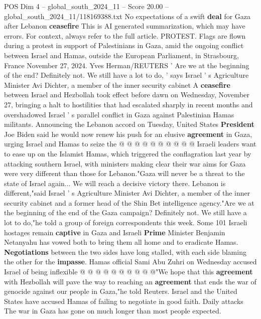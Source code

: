 \begin{textsample}{POS Dim 4 – global\_south\_2024\_11 – Score 20.00 – global\_south\_2024\_11/118169388.txt}  \label{ex:f4_pos_281}
No expectations of a swift \textbf{deal} for Gaza after Lebanon \textbf{ceasefire} This is AI generated summarization, which may have errors.
For context, always refer to the full article.
PROTEST.
Flags are flown during a protest in support of Palestinians in Gaza, amid the ongoing conflict between Israel and Hamas, outside the European Parliament, in Strasbourg, France November 27, 2024.
Yves Herman/REUTERS ' Are we at the beginning of the end?
Definitely not.
We still have a lot to do, ' says Israel ' s Agriculture Minister Avi Dichter, a member of the inner security cabinet A \textbf{ceasefire} between Israel and Hezbollah took effect before dawn on Wednesday, November 27, bringing a halt to hostilities that had escalated sharply in recent months and overshadowed Israel ' s parallel conflict in Gaza against Palestinian Hamas militants.
Announcing the Lebanon accord on Tuesday, United States \textbf{President} Joe Biden said he would now renew his push for an elusive \textbf{agreement} in Gaza, urging Israel and Hamas to seize the @ @ @ @ @ @ @ @ @ @ Israeli leaders want to ease up on the Islamist Hamas, which triggered the conflagration last year by attacking southern Israel, with ministers making clear their war aims for Gaza were very different than those for Lebanon."Gaza will never be a threat to the state of Israel again...
We will reach a decisive victory there.
Lebanon is different,"said Israel ' s Agriculture Minister Avi Dichter, a member of the inner security cabinet and a former head of the Shin Bet intelligence agency."Are we at the beginning of the end of the Gaza campaign?
Definitely not.
We still have a lot to do,"he told a group of foreign correspondents this week.
Some 101 Israeli hostages remain \textbf{captive} in Gaza and Israeli \textbf{Prime} Minister Benjamin Netanyahu has vowed both to bring them all home and to eradicate Hamas. \textbf{Negotiations} between the two sides have long stalled, with each side blaming the other for the \textbf{impasse}.
Hamas official Sami Abu Zuhri on Wednesday accused Israel of being inflexible @ @ @ @ @ @ @ @ @ @"We hope that this \textbf{agreement} with Hezbollah will pave the way to reaching an \textbf{agreement} that ends the war of genocide against our people in Gaza,"he told Reuters.
Israel and the United States have accused Hamas of failing to negotiate in good faith.
Daily attacks The war in Gaza has gone on much longer than most people expected.

\end{textsample}
